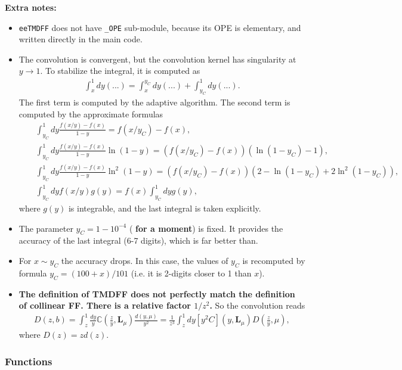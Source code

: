 \documentclass[prd,nofootinbib,eqsecnum,final]{revtex4}
\renewcommand{\(}{\left(}
\renewcommand{\)}{\right)}
\renewcommand{\[}{\left[}
\renewcommand{\]}{\right]}
\newcommand{\red}[1]{{\color[rgb]{1,0,0} #1}}
\begin{document}
\textbf{Extra notes:}
\begin{itemize}
\item \texttt{eeTMDFF} does not have \texttt{\_OPE} sub-module, because its OPE is elementary, and written directly in the main code.
\item The convolution is convergent, but the convolution kernel has singularity at $y\to1$. To stabilize the integral, it is computed as
\begin{eqnarray}
\int_x^1 dy (...)=\int_x^{y_C} dy (...)+\int_{y_C}^1 dy (...).
\end{eqnarray}
The first term is computed by the adaptive algorithm. The second term is computed by the approximate formulas
\begin{eqnarray*}
&& \int_{y_C}^1 dy \frac{f(x/y)-f(x)}{1-y}=f(x/y_C)-f(x),
\\
&&\int_{y_C}^1 dy \frac{f(x/y)-f(x)}{1-y}\ln(1-y)=(f(x/y_C)-f(x))(\ln(1-y_C)-1),
\\
&&\int_{y_C}^1 dy \frac{f(x/y)-f(x)}{1-y}\ln^2(1-y)=(f(x/y_C)-f(x))(2-\ln(1-y_C)+2\ln^2(1-y_C)),
\\
&& \int_{y_C}^1 dy f(x/y)g(y)=f(x)\int_{y_C}^1 dy g(y),
\end{eqnarray*}
where $g(y)$ is integrable, and the last integral is taken explicitly.
\item The parameter $y_C=1-10^{-4}$ (\textbf{\red{for a moment}}) is fixed. It provides the accuracy of the last integral (6-7 digits), which is far better than.
\item For $x\sim y_C$ the accuracy drops. In this case, the values of $y_C$ is recomputed by formula $y_C=(100+x)/101$ (i.e. it is 2-digits closer to 1 than $x$).
\item \textbf{The definition of TMDFF does not perfectly match the definition of collinear FF. There is a relative factor $1/z^2$.} So the convolution reads
\begin{eqnarray}
D(z,b)=\int_z^1 \frac{dy}{y}\mathbb{C}\(\frac{z}{y},\mathbf{L}_\mu\)\frac{d(y,\mu)}{y^2}=
\frac{1}{z^3}\int_z^1 dy [y^2C]\(y,\mathbf{L}_\mu\)D(\frac{z}{y},\mu),
\end{eqnarray}
where $D(z)=zd(z)$.
\end{itemize}

\subsubsection{Functions}
\end{document}
